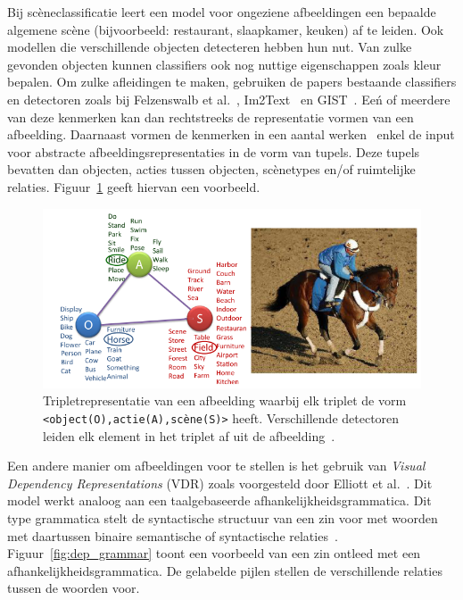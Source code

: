 Bij sc\`eneclassificatie leert een model voor ongeziene afbeeldingen een bepaalde algemene sc\`ene (bijvoorbeeld: restaurant, slaapkamer, keuken) af te leiden. Ook modellen die verschillende objecten detecteren hebben hun nut. Van zulke gevonden objecten kunnen classifiers ook nog nuttige eigenschappen zoals kleur bepalen. Om zulke afleidingen te maken, gebruiken de papers bestaande classifiers en detectoren zoals bij Felzenswalb et al.~\cite{Felzenszwalb2008}, Im2Text~\cite{Ordonez2011} en GIST~\cite{Oliva2006}. Ee\'n of meerdere van deze kenmerken kan dan rechtstreeks de representatie vormen van een afbeelding. Daarnaast vormen de kenmerken in een aantal werken~\cite{Farhadi2010,Li2011,Mitchell2012,Yang2011} enkel de input voor abstracte afbeeldingsrepresentaties in de vorm van tupels. Deze tupels bevatten dan objecten, acties tussen objecten, sc\`enetypes en/of ruimtelijke relaties. Figuur~\ref{fig:imgtriplets} geeft hiervan een voorbeeld.

\begin{figure}[tb]
	\centering
	\includegraphics[width=\linewidth]{Images/imgtriples.PNG}
	\caption[Tripletrepresentatie van een afbeelding]{Tripletrepresentatie van een afbeelding waarbij elk triplet de vorm \texttt{<object(O),actie(A),sc\`ene(S)>} heeft. Verschillende detectoren leiden elk element in het triplet af uit de afbeelding~\cite{Farhadi2010}.}
	\label{fig:imgtriplets}
\end{figure}  

Een andere manier om afbeeldingen voor te stellen is het gebruik van \emph{Visual Dependency Representations} (VDR) zoals voorgesteld door Elliott et al.~\cite{Elliott2013}. Dit model werkt analoog aan een taalgebaseerde afhankelijkheidsgrammatica. Dit type grammatica stelt de syntactische structuur van een zin voor met woorden met daartussen binaire semantische of syntactische relaties~\cite{Jurafsky:2009:SLP:1214993}. Figuur~\ref{fig:dep_grammar} toont een voorbeeld van een zin ontleed met een afhankelijkheidsgrammatica. De gelabelde pijlen stellen de verschillende relaties tussen de woorden voor.

